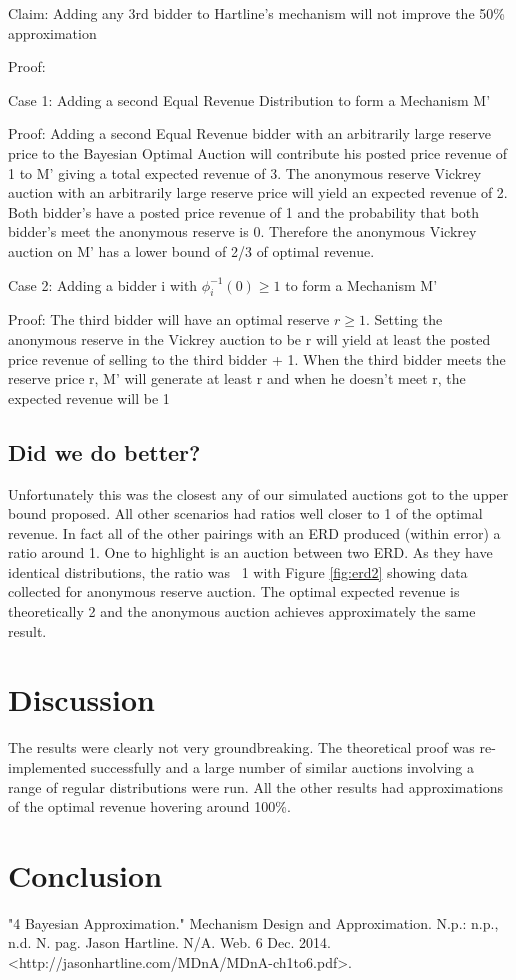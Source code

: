 \documentclass{acm_proc_article-sp}
\begin{document}
Claim: Adding any 3rd bidder to Hartline's mechanism will not improve the 50\% approximation

Proof:

Case 1: Adding a second Equal Revenue Distribution to form a Mechanism M'

Proof: Adding a second Equal Revenue bidder with an arbitrarily large reserve price to the Bayesian Optimal Auction will contribute his posted price revenue of 1 to M' giving a total expected revenue of 3. The anonymous reserve Vickrey auction with an arbitrarily large reserve price will yield an expected revenue of 2. Both bidder's have a posted price revenue of 1 and the probability that both bidder's meet the anonymous reserve is 0. Therefore the anonymous Vickrey auction on M' has a lower bound of 2/3 of optimal revenue.

Case 2: Adding a bidder i with $\phi_i^{-1}(0) \geq 1$ to form a Mechanism M'

Proof: The third bidder will have an optimal reserve $r \geq 1$.  Setting the anonymous reserve in the Vickrey auction to be r will yield at least the posted price revenue of selling to the third bidder + 1. When the third bidder meets the reserve price r, M' will generate at least r and when he doesn't meet r, the expected revenue will be 1 



\subsection{Did we do better?}

Unfortunately this was the closest any of our simulated auctions got to the upper bound proposed. All other scenarios had ratios well closer to 1 of the optimal revenue. In fact all of the other pairings with an ERD produced (within error) a ratio around 1. One to highlight is an auction between two ERD. As they have identical distributions, the ratio was ~1 with Figure \ref{fig:erd2} showing data collected for anonymous reserve auction. The optimal expected revenue is theoretically 2 and the anonymous auction achieves approximately the same result.



\section{Discussion}

The results were clearly not very groundbreaking. The theoretical proof was re-implemented successfully and a large number of similar auctions involving a range of regular distributions were run. All the other results had approximations of the optimal revenue hovering around 100\%.

\section{Conclusion}

\begin{thebibliography}{9}

		"4 Bayesian Approximation." Mechanism Design and Approximation. N.p.: n.p., n.d. N. pag. Jason Hartline. N/A. Web. 6 Dec. 2014. <http://jasonhartline.com/MDnA/MDnA-ch1to6.pdf>.

\end{thebibliography}
\end{document}
